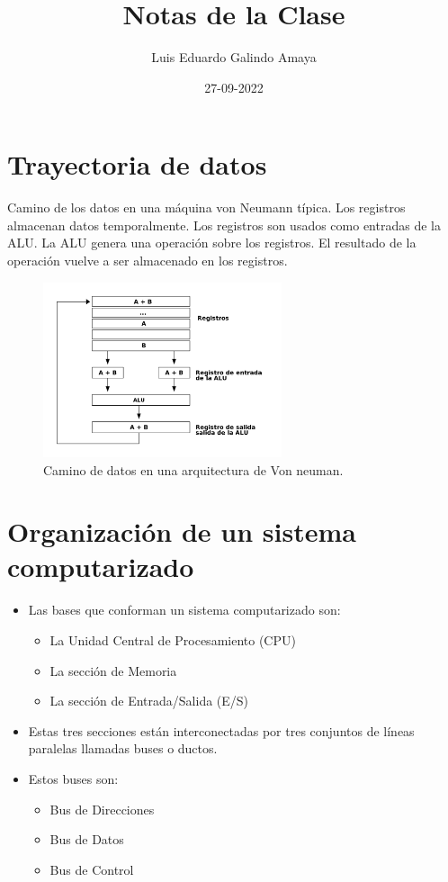 \documentclass[11pt]{article}
\author{Luis Eduardo Galindo Amaya}
\date{27-09-2022}
\title{Notas de la Clase}
\begin{document}
\maketitle
\setlength\parindent{0pt}
\tableofcontents
\pagebreak


\section{Trayectoria de datos}
\label{sec:org2aabb80}
Camino de los datos en una máquina von Neumann típica. Los registros almacenan datos temporalmente. Los registros son usados como entradas de la ALU. La ALU genera una operación sobre los registros. El resultado de la operación vuelve a ser almacenado en los registros.

\begin{figure}[htbp]
\centering
\includegraphics[width=7cm]{./img/trayectoria.png}
\caption{Camino de datos en una arquitectura de Von neuman.}
\end{figure}

\section{Organización de un sistema computarizado}
\label{sec:orgd380676}
\begin{itemize}
\item Las bases que conforman un sistema computarizado son:
\begin{itemize}
\item La Unidad Central de Procesamiento (CPU)
\item La sección de Memoria
\item La sección de Entrada/Salida (E/S)
\end{itemize}

\item Estas tres secciones están interconectadas por tres conjuntos de líneas paralelas llamadas buses o ductos.

\item Estos buses son:
\begin{itemize}
\item Bus de Direcciones
\item Bus de Datos
\item Bus de Control
\end{itemize}
\end{itemize}
\end{document}
